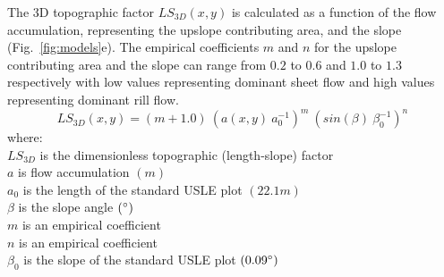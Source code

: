\documentclass[esurf, manuscript]{copernicus}
\begin{document}
The 3D topographic factor $LS_{3D}(x,y)$
is calculated as a function of 
the flow accumulation,
representing the upslope contributing area,
and the slope 
(Fig.~\ref{fig:models}e). %
%
The empirical coefficients $m$ and $n$
for the upslope contributing area 
and the slope
can range from $0.2$ to $0.6$
and $1.0$ to $1.3$ respectively
with low values representing dominant sheet flow
and high values representing dominant rill flow.
%
%
\begin{equation}
\label{eq:ls_factor}
{LS_{3D}(x,y) = (m+1.0) ~ (a(x,y) ~ a_0^{-1})^{m} ~ (sin(\beta) ~ \beta_0^{-1})^{n}}
\end{equation}
%
{\small
\noindent
where: \\
\noindent
\hspace*{0.5em} $LS_{3D}$ is the dimensionless topographic (length-slope) factor\\
\hspace*{0.5em} $a$ is flow accumulation $(m)$\\
\hspace*{0.5em} $a_0$ is the length of the standard USLE plot $(22.1 m)$\\
\hspace*{0.5em} $\beta$ is the slope angle $(^{\circ})$\\
\hspace*{0.5em} $m$ is an empirical coefficient\\
\hspace*{0.5em} $n$ is an empirical coefficient\\
\hspace*{0.5em} $\beta_0$ is the slope of the standard USLE plot $(0.09 ^{\circ})$\\
}


\end{document}
